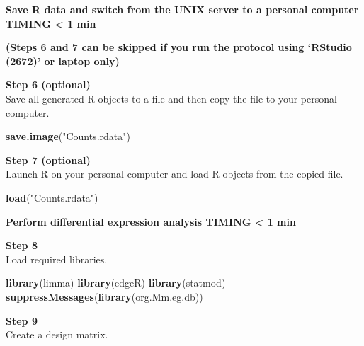 \documentclass[]{book}
\newenvironment{Shaded}{\begin{snugshade}}{\end{snugshade}}
\newcommand{\DecValTok}[1]{\textcolor[rgb]{0.00,0.00,0.81}{#1}}
\newcommand{\KeywordTok}[1]{\textcolor[rgb]{0.13,0.29,0.53}{\textbf{#1}}}
\newcommand{\NormalTok}[1]{#1}
\newcommand{\OperatorTok}[1]{\textcolor[rgb]{0.81,0.36,0.00}{\textbf{#1}}}
\newcommand{\StringTok}[1]{\textcolor[rgb]{0.31,0.60,0.02}{#1}}
\begin{document}
\textbf{Save R data and switch from the UNIX server to a personal computer TIMING \textless{} 1 min}

\textbf{(Steps 6 and 7 can be skipped if you run the protocol using `RStudio (2672)' or laptop only)}

\textbf{Step 6 (optional)}\\

Save all generated R objects to a file and then copy the file to your personal computer.

\begin{Shaded}
\begin{Highlighting}[]
\KeywordTok{save.image}\NormalTok{(}\StringTok{"Counts.rdata"}\NormalTok{)}
\end{Highlighting}
\end{Shaded}

\textbf{Step 7 (optional)}\\

Launch R on your personal computer and load R objects from the copied file.

\begin{Shaded}
\begin{Highlighting}[]
\KeywordTok{load}\NormalTok{(}\StringTok{"Counts.rdata"}\NormalTok{)}
\end{Highlighting}
\end{Shaded}

\textbf{Perform differential expression analysis TIMING \textless{} 1 min}

\textbf{Step 8}\\

Load required libraries.

\begin{Shaded}
\begin{Highlighting}[]
\KeywordTok{library}\NormalTok{(limma)}
\KeywordTok{library}\NormalTok{(edgeR)}
\KeywordTok{library}\NormalTok{(statmod)}
\KeywordTok{suppressMessages}\NormalTok{(}\KeywordTok{library}\NormalTok{(org.Mm.eg.db))}
\end{Highlighting}
\end{Shaded}

\textbf{Step 9}\\

Create a design matrix.

\begin{Shaded}
\end{Shaded}
\end{document}
